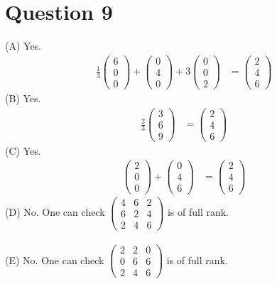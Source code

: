 \documentclass{article}
\begin{document}
\section*{Question 9}
(A) Yes.
\begin{align*}
    \frac{1}{3} \begin{pmatrix}6\\0\\0\end{pmatrix} + \begin{pmatrix}0\\4\\0\end{pmatrix} + 3\begin{pmatrix}0\\0\\2\end{pmatrix} &= \begin{pmatrix}2\\4\\6\end{pmatrix}
\end{align*}
(B) Yes.
\begin{align*}
    \frac{2}{3} \begin{pmatrix} 3 \\ 6 \\ 9 \end{pmatrix} &= \begin{pmatrix} 2\\ 4 \\ 6 \end{pmatrix}
\end{align*}
(C) Yes.
\begin{align*} 
    \begin{pmatrix} 2 \\ 0 \\ 0 \end{pmatrix}
    + \begin{pmatrix} 0 \\ 4 \\ 6 \end{pmatrix} 
    &= \begin{pmatrix} 2 \\ 4 \\ 6 \end{pmatrix} 
\end{align*}
(D)
No. One can check $\begin{pmatrix} 4 & 6 & 2 \\ 6 & 2 & 4 \\ 2 & 4 & 6\end{pmatrix}$ is of full rank. \\\\
(E) 
No. One can check $\begin{pmatrix} 2 & 2 & 0 \\ 0 & 6 & 6  \\ 2 & 4 & 6\end{pmatrix}$ is of full rank.
\end{document}
